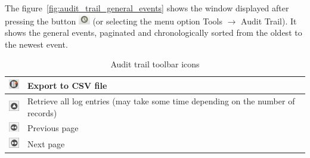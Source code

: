 \documentclass[a4paper]{article}
\begin{document}
	The figure~\ref{fig:audit_trail_general_events} shows the window displayed after pressing the \textbf{} button \includegraphics[width=0.5cm]{img/icon_audit_trail} (or selecting the menu option Tools $\rightarrow$ Audit Trail). It shows the general events, paginated and chronologically sorted from the oldest to the newest event.
	\begin{table}[h!]
		\centering
		\begin{tabular}{lp{10cm}}
			\includegraphics[width=0.5cm]{img/icon_export.png} & Export to CSV file \\
			\midrule
			\includegraphics[width=0.5cm]{img/icon_retrieve_all.png} & Retrieve all log entries (may take some time depending on the number of records) \\
			\midrule
			\includegraphics[width=0.5cm]{img/icon_previous_page.png} & Previous page \\
			\midrule
			\includegraphics[width=0.5cm]{img/icon_next_page.png} & Next page \\
		\end{tabular}
		\caption{Audit trail toolbar icons}
	\end{table}
	
\end{document}
